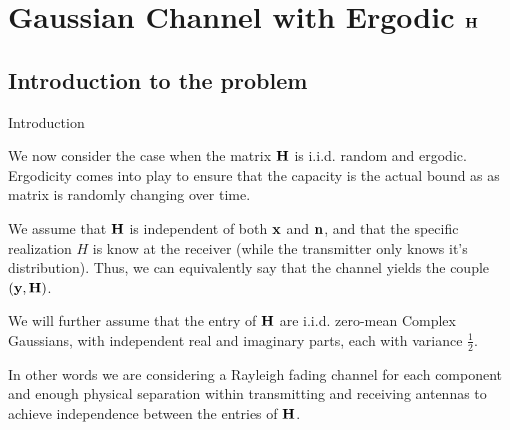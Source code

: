 \section{Gaussian Channel with Ergodic $\vb{H}$}
\subsection{Introduction to the problem}
\begin{frame}{Introduction}

We now consider the case when the matrix $\vb{H}$ is i.i.d. random and ergodic. Ergodicity comes into play to ensure that the capacity is the actual bound as as matrix is randomly changing over time.

\medskip
We assume that $\vb{H}$ is independent of both $\vb{x}$ and $\vb{n}$, and that the specific realization $H$ is know at the receiver (while the transmitter only knows it's distribution). Thus, we can equivalently say that the channel yields the couple $(\vb{y,H})$.

\medskip
We will further assume that the entry of $\vb{H}$ are i.i.d. zero-mean Complex Gaussians, with independent real and imaginary parts, each with variance $\frac{1}{2}$.

\medskip
In other words we are considering a Rayleigh fading channel for each component and enough physical separation within transmitting and receiving antennas to achieve independence between the entries of $\vb{H}$.

\end{frame}


